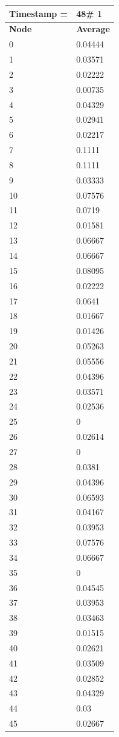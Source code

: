 \begin{tabular}{|l||l|}
\hline
\textbf{Timestamp =} & \textbf{48}\# 1\\\hline
	\textbf{Node} & \textbf{Average} \\ \hline
\hline
	0 & 0.04444 \\ \hline
	1 & 0.03571 \\ \hline
	2 & 0.02222 \\ \hline
	3 & 0.00735 \\ \hline
	4 & 0.04329 \\ \hline
	5 & 0.02941 \\ \hline
	6 & 0.02217 \\ \hline
	7 & 0.1111 \\ \hline
	8 & 0.1111 \\ \hline
	9 & 0.03333 \\ \hline
	10 & 0.07576 \\ \hline
	11 & 0.0719 \\ \hline
	12 & 0.01581 \\ \hline
	13 & 0.06667 \\ \hline
	14 & 0.06667 \\ \hline
	15 & 0.08095 \\ \hline
	16 & 0.02222 \\ \hline
	17 & 0.0641 \\ \hline
	18 & 0.01667 \\ \hline
	19 & 0.01426 \\ \hline
	20 & 0.05263 \\ \hline
	21 & 0.05556 \\ \hline
	22 & 0.04396 \\ \hline
	23 & 0.03571 \\ \hline
	24 & 0.02536 \\ \hline
	25 & 0 \\ \hline
	26 & 0.02614 \\ \hline
	27 & 0 \\ \hline
	28 & 0.0381 \\ \hline
	29 & 0.04396 \\ \hline
	30 & 0.06593 \\ \hline
	31 & 0.04167 \\ \hline
	32 & 0.03953 \\ \hline
	33 & 0.07576 \\ \hline
	34 & 0.06667 \\ \hline
	35 & 0 \\ \hline
	36 & 0.04545 \\ \hline
	37 & 0.03953 \\ \hline
	38 & 0.03463 \\ \hline
	39 & 0.01515 \\ \hline
	40 & 0.02621 \\ \hline
	41 & 0.03509 \\ \hline
	42 & 0.02852 \\ \hline
	43 & 0.04329 \\ \hline
	44 & 0.03 \\ \hline
	45 & 0.02667 \\ \hline
\end{tabular}
